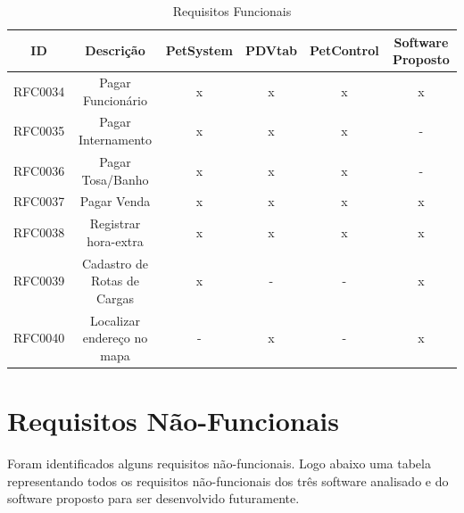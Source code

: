 \documentclass[12pt,openright,twoside,a4paper,english,french,spanish,brazil]{abntex2}
\begin{document}
\begin{landscape}
\begin{table}[!htpb]
\centering
\begin{small} 
\setlength{\tabcolsep}{3pt} 
\begin{tabular}{rccccc}
    \toprule
    \multicolumn{1}{c}{\textbf{ID}} & \textbf{Descrição} & \textbf{PetSystem} & \textbf{PDVtab} & \textbf{PetControl} & \textbf{Software Proposto} \\
    \midrule
    RFC0034 & Pagar Funcionário & x & x & x & x \\
    RFC0035 & Pagar Internamento & x & x & x & - \\
    RFC0036 & Pagar Tosa/Banho & x & x & x & - \\
    RFC0037 & Pagar Venda & x & x & x & x \\
    RFC0038 & Registrar hora-extra & x & x & x & x \\
    RFC0039 & Cadastro de Rotas de Cargas & x & - & - & x \\
    RFC0040 & Localizar endereço no mapa & - & x & - & x \\
    \bottomrule
    \end{tabular}%
  \label{tab:addlabel}%
\end{small}
\caption{Requisitos Funcionais}\label{tab_requisitosFuncionais}
\end{table}
\end{landscape}

\section*{Requisitos Não-Funcionais}

Foram identificados alguns requisitos não-funcionais. Logo abaixo uma tabela representando todos os requisitos não-funcionais dos três software analisado e do software proposto para ser desenvolvido futuramente.
\end{document}
